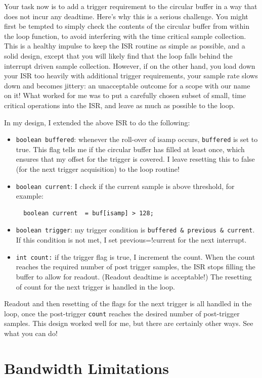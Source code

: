 \documentclass[12pt]{article}
\begin{document}
Your task now is to add a trigger requirement to the circular buffer in a way that does not incur any deadtime.  Here's why this is a serious challenge.  You might first be tempted to simply check the contents of the circular buffer from within the loop function, to avoid interfering with the time critical sample collection.  This is a healthy impulse to keep the ISR routine as simple as possible, and a solid design, except that you will likely find that the loop falls behind the interrupt driven sample collection.  However, if on the other hand, you load down your ISR too heavily with additional trigger requirements, your sample rate slows down and becomes jittery:  an unacceptable outcome for a scope with our name on it!  What worked for me was to put a carefully chosen subset of small, time critical operations into the ISR, and leave as much as possible to the loop.

In my design, I extended the above ISR to do the following:
\begin{itemize}
\item {\tt boolean buffered}:  whenever the roll-over of isamp occurs, {\tt buffered} is set to true.   This flag tells me if the circular buffer has filled at least once, which ensures that my offset for the trigger is covered.
I leave resetting this to false (for the next trigger acquisition) to the loop routine!
\item {\tt boolean current}:  I check if the current sample is above threshold, for example:
\begin{verbatim}
  boolean current  = buf[isamp] > 128;
\end{verbatim} 
\item {\tt boolean trigger}: my trigger condition is  {\tt buffered \& previous \& current}.  If this condition is not met, I set previous=!current for the next interrupt.
\item {\tt int count:}  if the trigger flag is true, I increment the count.  When the count reaches the required number of post trigger samples, the ISR stops filling the buffer to allow for readout.  (Readout deadtime is acceptable!)  The resetting of count for the next trigger is handled in the loop.
\end{itemize} 
Readout and then resetting of the flags for the next trigger is all handled in the loop, once the post-trigger {\tt count} reaches the desired number of post-trigger samples.  This design worked well for me, but there are certainly other ways.  See what you can do!

\section{Bandwidth Limitations}
\end{document}
